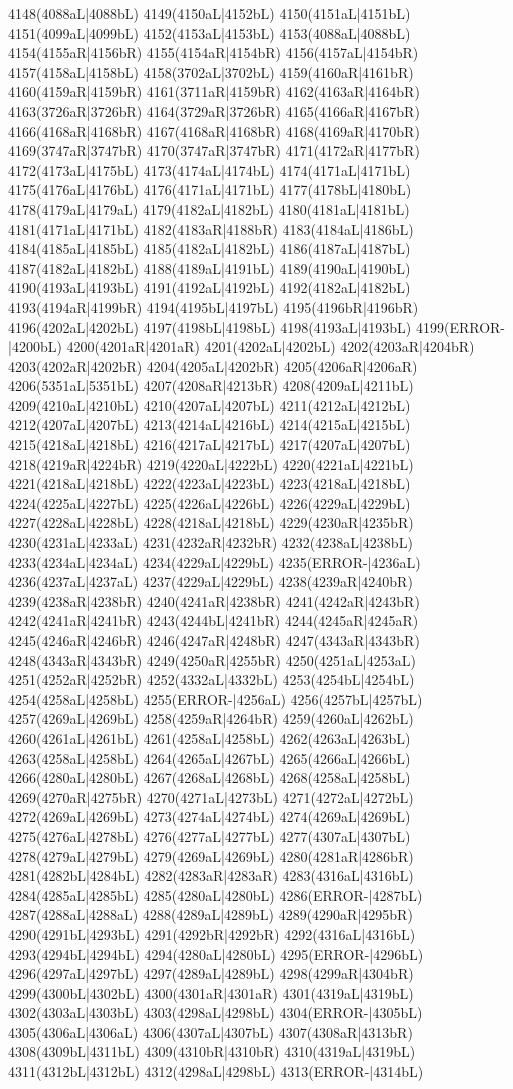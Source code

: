 4148(4088aL|4088bL) 4149(4150aL|4152bL) 4150(4151aL|4151bL) 4151(4099aL|4099bL) 4152(4153aL|4153bL) 4153(4088aL|4088bL) 4154(4155aR|4156bR) 4155(4154aR|4154bR) 4156(4157aL|4154bR) 4157(4158aL|4158bL) 4158(3702aL|3702bL) 4159(4160aR|4161bR) 4160(4159aR|4159bR) 4161(3711aR|4159bR) 4162(4163aR|4164bR) 4163(3726aR|3726bR) 4164(3729aR|3726bR) 4165(4166aR|4167bR) 4166(4168aR|4168bR) 4167(4168aR|4168bR) 4168(4169aR|4170bR) 4169(3747aR|3747bR) 4170(3747aR|3747bR) 4171(4172aR|4177bR) 4172(4173aL|4175bL) 4173(4174aL|4174bL) 4174(4171aL|4171bL) 4175(4176aL|4176bL) 4176(4171aL|4171bL) 4177(4178bL|4180bL) 4178(4179aL|4179aL) 4179(4182aL|4182bL) 4180(4181aL|4181bL) 4181(4171aL|4171bL) 4182(4183aR|4188bR) 4183(4184aL|4186bL) 4184(4185aL|4185bL) 4185(4182aL|4182bL) 4186(4187aL|4187bL) 4187(4182aL|4182bL) 4188(4189aL|4191bL) 4189(4190aL|4190bL) 4190(4193aL|4193bL) 4191(4192aL|4192bL) 4192(4182aL|4182bL) 4193(4194aR|4199bR) 4194(4195bL|4197bL) 4195(4196bR|4196bR) 4196(4202aL|4202bL) 4197(4198bL|4198bL) 4198(4193aL|4193bL) 4199(ERROR-|4200bL) 4200(4201aR|4201aR) 4201(4202aL|4202bL) 4202(4203aR|4204bR) 4203(4202aR|4202bR) 4204(4205aL|4202bR) 4205(4206aR|4206aR) 4206(5351aL|5351bL) 4207(4208aR|4213bR) 4208(4209aL|4211bL) 4209(4210aL|4210bL) 4210(4207aL|4207bL) 4211(4212aL|4212bL) 4212(4207aL|4207bL) 4213(4214aL|4216bL) 4214(4215aL|4215bL) 4215(4218aL|4218bL) 4216(4217aL|4217bL) 4217(4207aL|4207bL) 4218(4219aR|4224bR) 4219(4220aL|4222bL) 4220(4221aL|4221bL) 4221(4218aL|4218bL) 4222(4223aL|4223bL) 4223(4218aL|4218bL) 4224(4225aL|4227bL) 4225(4226aL|4226bL) 4226(4229aL|4229bL) 4227(4228aL|4228bL) 4228(4218aL|4218bL) 4229(4230aR|4235bR) 4230(4231aL|4233aL) 4231(4232aR|4232bR) 4232(4238aL|4238bL) 4233(4234aL|4234aL) 4234(4229aL|4229bL) 4235(ERROR-|4236aL) 4236(4237aL|4237aL) 4237(4229aL|4229bL) 4238(4239aR|4240bR) 4239(4238aR|4238bR) 4240(4241aR|4238bR) 4241(4242aR|4243bR) 4242(4241aR|4241bR) 4243(4244bL|4241bR) 4244(4245aR|4245aR) 4245(4246aR|4246bR) 4246(4247aR|4248bR) 4247(4343aR|4343bR) 4248(4343aR|4343bR) 4249(4250aR|4255bR) 4250(4251aL|4253aL) 4251(4252aR|4252bR) 4252(4332aL|4332bL) 4253(4254bL|4254bL) 4254(4258aL|4258bL) 4255(ERROR-|4256aL) 4256(4257bL|4257bL) 4257(4269aL|4269bL) 4258(4259aR|4264bR) 4259(4260aL|4262bL) 4260(4261aL|4261bL) 4261(4258aL|4258bL) 4262(4263aL|4263bL) 4263(4258aL|4258bL) 4264(4265aL|4267bL) 4265(4266aL|4266bL) 4266(4280aL|4280bL) 4267(4268aL|4268bL) 4268(4258aL|4258bL) 4269(4270aR|4275bR) 4270(4271aL|4273bL) 4271(4272aL|4272bL) 4272(4269aL|4269bL) 4273(4274aL|4274bL) 4274(4269aL|4269bL) 4275(4276aL|4278bL) 4276(4277aL|4277bL) 4277(4307aL|4307bL) 4278(4279aL|4279bL) 4279(4269aL|4269bL) 4280(4281aR|4286bR) 4281(4282bL|4284bL) 4282(4283aR|4283aR) 4283(4316aL|4316bL) 4284(4285aL|4285bL) 4285(4280aL|4280bL) 4286(ERROR-|4287bL) 4287(4288aL|4288aL) 4288(4289aL|4289bL) 4289(4290aR|4295bR) 4290(4291bL|4293bL) 4291(4292bR|4292bR) 4292(4316aL|4316bL) 4293(4294bL|4294bL) 4294(4280aL|4280bL) 4295(ERROR-|4296bL) 4296(4297aL|4297bL) 4297(4289aL|4289bL) 4298(4299aR|4304bR) 4299(4300bL|4302bL) 4300(4301aR|4301aR) 4301(4319aL|4319bL) 4302(4303aL|4303bL) 4303(4298aL|4298bL) 4304(ERROR-|4305bL) 4305(4306aL|4306aL) 4306(4307aL|4307bL) 4307(4308aR|4313bR) 4308(4309bL|4311bL) 4309(4310bR|4310bR) 4310(4319aL|4319bL) 4311(4312bL|4312bL) 4312(4298aL|4298bL) 4313(ERROR-|4314bL) 